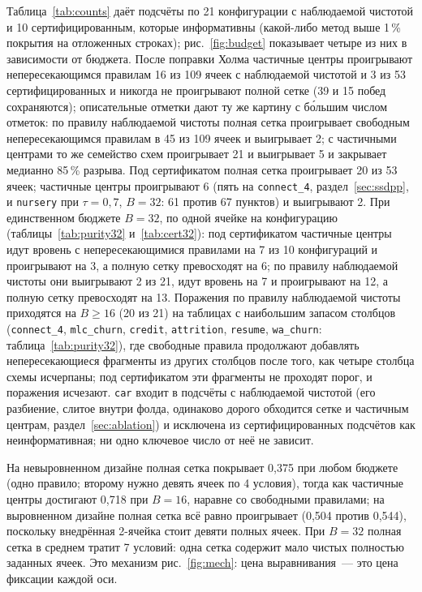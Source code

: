 \documentclass[11pt]{article}
\begin{document}
Таблица~\ref{tab:counts} даёт подсчёты по 21 конфигурации с наблюдаемой чистотой и 10 сертифицированным, которые информативны (какой-либо метод выше 1\,\% покрытия на отложенных строках); рис.~\ref{fig:budget} показывает четыре из них в зависимости от бюджета. После поправки Холма частичные центры проигрывают непересекающимся правилам 16 из 109 ячеек с наблюдаемой чистотой и 3 из 53 сертифицированных и никогда не проигрывают полной сетке (39 и 15 побед сохраняются); описательные отметки дают ту же картину с бо́льшим числом отметок: по правилу наблюдаемой чистоты полная сетка проигрывает свободным непересекающимся правилам в 45 из 109 ячеек и выигрывает 2; с частичными центрами то же семейство схем проигрывает 21 и выигрывает 5 и закрывает медианно 85\,\% разрыва. Под сертификатом полная сетка проигрывает 20 из 53 ячеек; частичные центры проигрывают 6 (пять на \texttt{connect\_4}, раздел~\ref{sec:ssdpp}, и \texttt{nursery} при $\tau=0{,}7$, $B=32$: 61 против 67 пунктов) и выигрывают 2. При единственном бюджете $B=32$, по одной ячейке на конфигурацию (таблицы~\ref{tab:purity32} и~\ref{tab:cert32}): под сертификатом частичные центры идут вровень с непересекающимися правилами на 7 из 10 конфигураций и проигрывают на 3, а полную сетку превосходят на 6; по правилу наблюдаемой чистоты они выигрывают 2 из 21, идут вровень на 7 и проигрывают на 12, а полную сетку превосходят на 13. Поражения по правилу наблюдаемой чистоты приходятся на $B\ge16$ (20 из 21) на таблицах с наибольшим запасом столбцов (\texttt{connect\_4}, \texttt{mlc\_churn}, \texttt{credit}, \texttt{attrition}, \texttt{resume}, \texttt{wa\_churn}: таблица~\ref{tab:purity32}), где свободные правила продолжают добавлять непересекающиеся фрагменты из других столбцов после того, как четыре столбца схемы исчерпаны; под сертификатом эти фрагменты не проходят порог, и поражения исчезают. \texttt{car} входит в подсчёты с наблюдаемой чистотой (его разбиение, слитое внутри фолда, одинаково дорого обходится сетке и частичным центрам, раздел~\ref{sec:ablation}) и исключена из сертифицированных подсчётов как неинформативная; ни одно ключевое число от неё не зависит.

На невыровненном дизайне полная сетка покрывает 0,375 при любом бюджете (одно правило; второму нужно девять ячеек по 4 условия), тогда как частичные центры достигают 0,718 при $B=16$, наравне со свободными правилами; на выровненном дизайне полная сетка всё равно проигрывает (0,504 против 0,544), поскольку внедрённая 2-ячейка стоит девяти полных ячеек. При $B=32$ полная сетка в среднем тратит 7 условий: одна сетка содержит мало чистых полностью заданных ячеек. Это механизм рис.~\ref{fig:mech}: цена выравнивания~--- это цена фиксации каждой оси.
\end{document}
